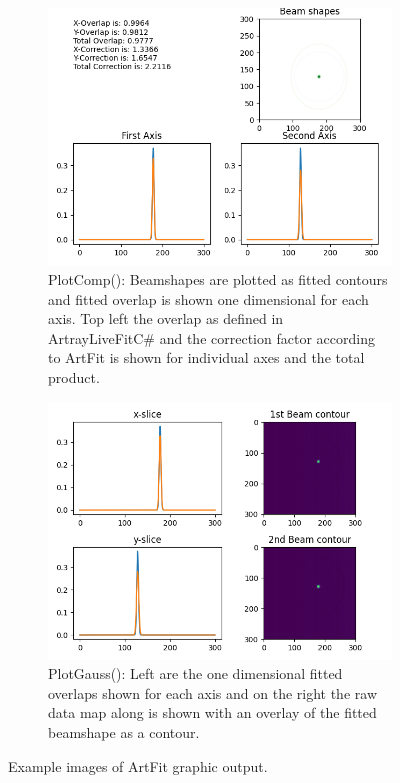 \documentclass[twoside,openright,listof=numbered]{scrreprt}
\begin{document}
\begin{figure}[hbtp]
\centering
\begin{subfigure}[t]{0.49\linewidth}
\centering
\includegraphics[width=\columnwidth]{images/ArtrayExamplePics/ArtFit_PlotComp.png}
\caption{PlotComp(): Beamshapes are plotted as fitted contours and fitted overlap is shown one dimensional for each axis. Top left the overlap as defined in ArtrayLiveFitC\# and the correction factor according to ArtFit is shown for individual axes and the total product.\label{fig:plotComp}}
\end{subfigure}
\hfill
\begin{subfigure}[t]{0.49\linewidth}
\centering
\includegraphics[width=\columnwidth]{images/ArtrayExamplePics/ArtFit_PlotGauss.png}
\caption{PlotGauss(): Left are the one dimensional fitted overlaps shown for each axis and on the right the raw data map along is shown with an overlay of the fitted beamshape as a contour.\label{fig:plotGauss}}
\end{subfigure}
\caption{Example images of ArtFit graphic output.}
\end{figure}
\end{document}
